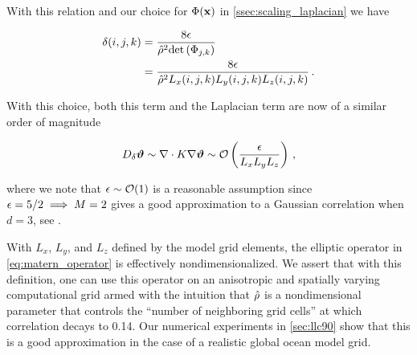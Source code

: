 With this relation and our choice for $\Phi(\mathbf{x})$ in
\cref{ssec:scaling_laplacian} we have
\begin{linenomath*}\begin{equation*}
    \begin{aligned}
        \delta(i,j,k) &= \dfrac{8\epsilon}{\hat{\rho}^2\text{det}\left(\Phi_{{j,k}}\right)} \\
                      &= \dfrac{8\epsilon}{\hat{\rho}^2 L_x(i,j,k)L_y(i,j,k) L_z(i,j,k)} \, .
    \end{aligned}
\end{equation*}\end{linenomath*}
With this choice, both this term and the Laplacian term are now of a similar order of
magnitude
\begin{linenomath*}\begin{equation*}
    D_{\delta}\bm{\vartheta} \sim \nabla \cdot K \nabla \bm{\vartheta} \sim
    \mathcal{O}\left(\dfrac{\epsilon}{L_xL_yL_z}\right) \, ,
\end{equation*}\end{linenomath*}
where we note that $\epsilon \sim \mathcal{O}(1)$ is a reasonable assumption since
$\epsilon=5/2 \implies M=2$ gives a good approximation to a Gaussian
correlation when $d=3$, see .

With $L_x$, $L_y$, and $L_z$ defined by the model grid elements, the elliptic
operator in \cref{eq:matern_operator} is effectively nondimensionalized.
We assert that with this definition, one can use this operator on an
anisotropic and spatially varying computational grid armed with the intuition that
$\hat{\rho}$ is a nondimensional parameter that controls the
``number of neighboring grid cells'' at which correlation decays to 0.14.
Our numerical experiments in \cref{sec:llc90} show that this is a good
approximation in the case of a realistic global ocean model grid.

